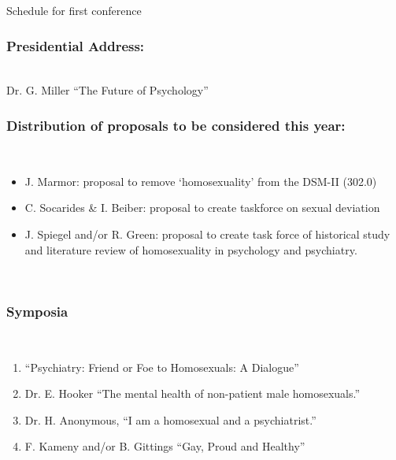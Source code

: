 \begin{refsection}
\begin{apatextbox}{Schedule for first conference}
\\

\subsubsection{Presidential Address:}
\label{presidentialaddress:}

\\

Dr. G. Miller “The Future of Psychology”\\

\subsubsection{Distribution of proposals to be considered this year:}
\label{distributionofproposalstobeconsideredthisyear:}

\\

\begin{itemize}
\item J. Marmor: proposal to remove `homosexuality' from the DSM-II (302.0)

\item C. Socarides \& I. Beiber: proposal to create taskforce on sexual deviation

\item J. Spiegel and\slash or R. Green: proposal to create task force of historical study and literature review of homosexuality in psychology and psychiatry.

\end{itemize}

\\

\subsubsection{Symposia}
\label{symposia}

\\

\begin{enumerate}
\item “Psychiatry: Friend or Foe to Homosexuals: A Dialogue” 

\item Dr. E. Hooker “The mental health of non-patient male homosexuals.”

\item Dr. H. Anonymous, “I am a homosexual and a psychiatrist.”

\item F. Kameny and\slash or B. Gittings “Gay, Proud and Healthy” 


\end{enumerate}
\end{apatextbox}
\end{refsection}
